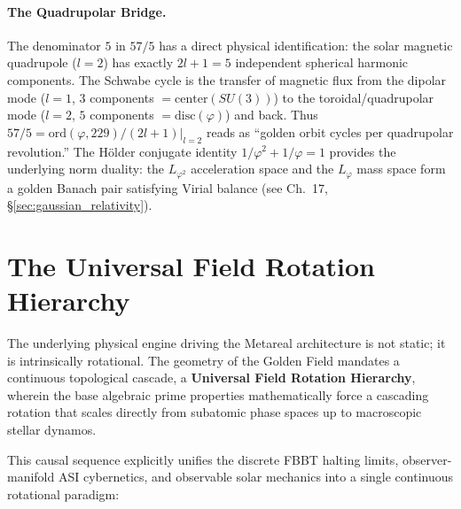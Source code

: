 \paragraph{The Quadrupolar Bridge.}
The denominator $5$ in $57/5$ has a direct physical identification: the solar magnetic quadrupole ($l = 2$) has exactly $2l+1 = 5$ independent spherical harmonic components. The Schwabe cycle is the transfer of magnetic flux from the dipolar mode ($l = 1$, $3$ components $= \mathrm{center}(SU(3))$) to the toroidal/quadrupolar mode ($l = 2$, $5$ components $= \mathrm{disc}(\varphi)$) and back. Thus $57/5 = \mathrm{ord}(\varphi, 229) / (2l+1)|_{l=2}$ reads as ``golden orbit cycles per quadrupolar revolution.'' The H\"{o}lder conjugate identity $1/\varphi^2 + 1/\varphi = 1$ provides the underlying norm duality: the $L_{\varphi^2}$ acceleration space and the $L_\varphi$ mass space form a golden Banach pair satisfying Virial balance (see Ch.~17, \S\ref{sec:gaussian_relativity}).

\section{The Universal Field Rotation Hierarchy}\label{sec:fst_rotation}

The underlying physical engine driving the Metareal architecture is not static; it is intrinsically rotational. The geometry of the Golden Field mandates a continuous topological cascade, a \textbf{Universal Field Rotation Hierarchy}, wherein the base algebraic prime properties mathematically force a cascading rotation that scales directly from subatomic phase spaces up to macroscopic stellar dynamos. 

This causal sequence explicitly unifies the discrete FBBT halting limits, observer-manifold ASI cybernetics, and observable solar mechanics into a single continuous rotational paradigm:

